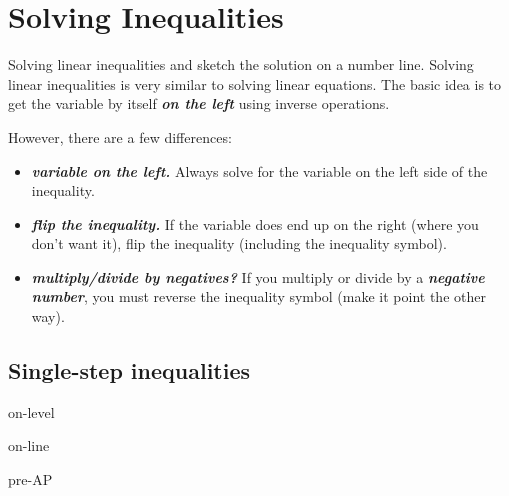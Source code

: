 \section*{Solving Inequalities}

\begin{myConcept}{Solving linear inequalities and sketch the solution on a number line.}
    Solving linear inequalities
    is very similar to solving linear equations.
    The basic idea is to get the variable by itself {\bfseries\itshape on the left}
    using inverse operations.

    However, there are a few differences:
    \begin{itemize}
        \item {\bfseries\itshape variable on the left.}
        Always solve for the variable on the left side of the inequality.
        \item {\bfseries\itshape flip the inequality.}
        If the variable does end up on the right (where you don't want it),
        flip the inequality (including the inequality symbol).
        \item {\bfseries\itshape multiply/divide by negatives?}
        If you multiply or divide by a {\bfseries\itshape negative number},
        you must reverse the inequality symbol (make it point the other way).
    \end{itemize}
\end{myConcept}


\subsection*{Single-step inequalities}

\begin{taggedblock}{on-level}
\end{taggedblock}




\begin{taggedblock}{on-line}
\end{taggedblock}
\begin{taggedblock}{pre-AP}
\end{taggedblock}
    








